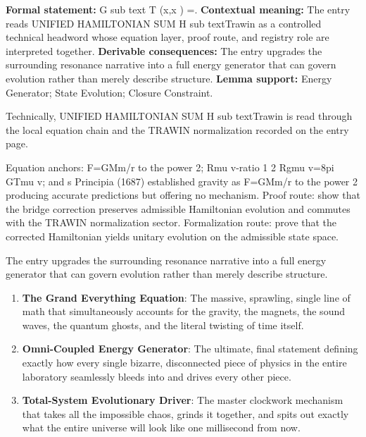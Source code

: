 \begingroup\footnotesize\setlength{\emergencystretch}{3em}\sloppy
\textbf{Formal statement:} G sub text T (x,x ) =. \textbf{Contextual meaning:} The entry reads UNIFIED HAMILTONIAN SUM H sub textTrawin as a controlled technical headword whose equation layer, proof route, and registry role are interpreted together. \textbf{Derivable consequences:} The entry upgrades the surrounding resonance narrative into a full energy generator that can govern evolution rather than merely describe structure. \textbf{Lemma support:} Energy Generator; State Evolution; Closure Constraint.\par
\endgroup

Technically, UNIFIED HAMILTONIAN SUM H sub textTrawin is read through the local equation chain and the TRAWIN normalization recorded on the entry page.

Equation anchors: F=GMm/r to the power 2; Rmu v-ratio 1 2 Rgmu v=8pi GTmu v; and s Principia (1687) established gravity as F=GMm/r to the power 2 producing accurate predictions but offering no mechanism. Proof route: show that the bridge correction preserves admissible Hamiltonian evolution and commutes with the TRAWIN normalization sector. Formalization route: prove that the corrected Hamiltonian yields unitary evolution on the admissible state space.

The entry upgrades the surrounding resonance narrative into a full energy generator that can govern evolution rather than merely describe structure.
\endgroup

\begin{enumerate}[leftmargin=1.6em,itemsep=6pt,topsep=4pt]
\item \textbf{The Grand Everything Equation}: The massive, sprawling, single line of math that simultaneously accounts for the gravity, the magnets, the sound waves, the quantum ghosts, and the literal twisting of time itself.
\item \textbf{Omni-Coupled Energy Generator}: The ultimate, final statement defining exactly how every single bizarre, disconnected piece of physics in the entire laboratory seamlessly bleeds into and drives every other piece.
\item \textbf{Total-System Evolutionary Driver}: The master clockwork mechanism that takes all the impossible chaos, grinds it together, and spits out exactly what the entire universe will look like one millisecond from now.
\end{enumerate}

